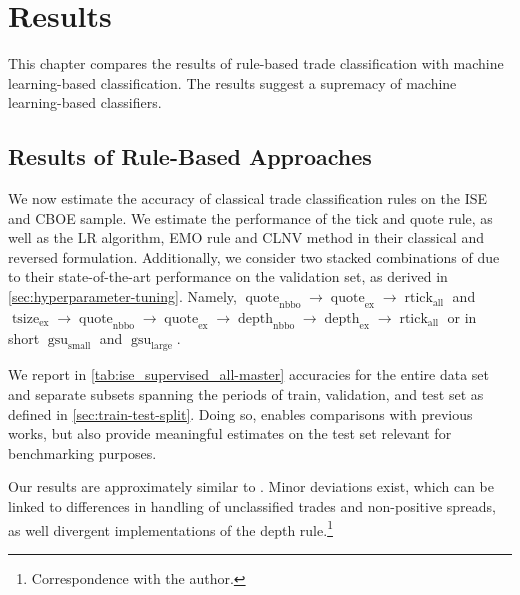 \section{Results}\label{sec:results}

This chapter compares the results of rule-based trade classification with machine learning-based classification. The results suggest a supremacy of machine learning-based classifiers.

\subsection{Results of Rule-Based Approaches}\label{sec:result-of-rule-based-approaches}

We now estimate the accuracy of classical trade classification rules on the \gls{ISE} and \gls{CBOE} sample. We estimate the performance of the tick and quote rule, as well as the \gls{LR} algorithm, \gls{EMO} rule and \gls{CLNV} method in their classical and reversed formulation. Additionally, we consider two stacked combinations of \textcite[][12--14]{grauerOptionTradeClassification2022} due to their state-of-the-art performance on the validation set, as derived in \cref{sec:hyperparameter-tuning}. Namely, $\operatorname{quote}_{\mathrm{nbbo}} \to \operatorname{quote}_{\mathrm{ex}} \to \operatorname{rtick}_{\mathrm{all}}$ and $\operatorname{tsize}_{\mathrm{ex}} \to \operatorname{quote}_{\mathrm{nbbo}} \to \operatorname{quote}_{\mathrm{ex}} \to \operatorname{depth}_{\mathrm{nbbo}} \to \operatorname{depth}_{\mathrm{ex}} \to \operatorname{rtick}_{\mathrm{all}}$ or in short $\operatorname{gsu}_{\mathrm{small}}$ and $\operatorname{gsu}_{\mathrm{large}}$.

We report in \cref{tab:ise_supervised_all-master} accuracies for the entire data set and separate subsets spanning the periods of train, validation, and test set as defined in \cref{sec:train-test-split}. Doing so, enables comparisons with previous works, but also provide meaningful estimates on the test set relevant for benchmarking purposes.

Our results are approximately similar to \textcite[][29--33]{grauerOptionTradeClassification2022}. Minor deviations exist, which can be linked to differences in handling of unclassified trades and non-positive spreads, as well divergent implementations of the depth rule.\footnote{Correspondence with the author.}

